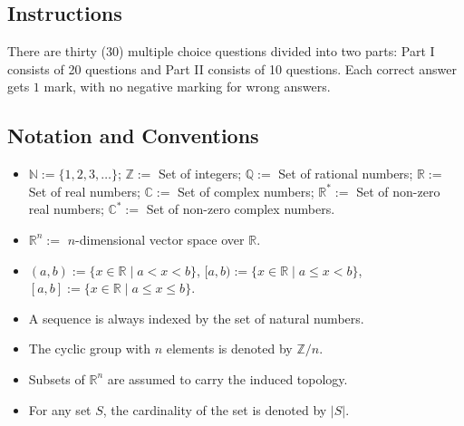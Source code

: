 \documentclass[11pt, a4paper]{article}
\begin{document}
\subsection*{Instructions}
There are thirty (30) multiple choice questions divided into two parts: Part I consists of 20 questions and Part II consists of 10 questions. Each correct answer gets $1$ mark, with no negative marking for wrong answers.

\subsection*{Notation and Conventions}
\begin{itemize}
  \item $\mathbb{N} := \{1, 2, 3, \dots\}$; $\mathbb{Z} :=$ Set of integers; $\mathbb{Q} :=$ Set of rational numbers; $\mathbb{R} :=$ Set of real numbers; $\mathbb{C} :=$ Set of complex numbers; $\mathbb{R}^* :=$ Set of non-zero real numbers; $\mathbb{C}^* :=$ Set of non-zero complex numbers.
  \item $\mathbb{R}^n :=$ $n$-dimensional vector space over $\mathbb{R}$.
  \item $(a, b) := \{x \in \mathbb{R} \mid a < x < b\}$, $[a, b) := \{x \in \mathbb{R} \mid a \le x < b\}$, $[a, b] := \{x \in \mathbb{R} \mid a \le x \le b\}$.
  \item A sequence is always indexed by the set of natural numbers.
  \item The cyclic group with $n$ elements is denoted by $\mathbb{Z}/n$.
  \item Subsets of $\mathbb{R}^n$ are assumed to carry the induced topology.
  \item For any set $S$, the cardinality of the set is denoted by $|S|$.
\end{itemize}
\end{document}
